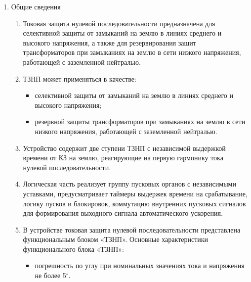 
\color{black}

\begin{enumerate}

\item Общие сведения

\begin{enumerate}

\item
Токовая защита нулевой последовательности предназначена для селективной защиты от замыканий на землю в линиях среднего и высокого напряжения, а также для резервирования защит трансформаторов при замыканиях на землю в сети низкого напряжения, работающей с заземленной нейтралью.

\item
ТЗНП может применяться в качестве:
\begin{itemize}
    \item селективной защиты от замыканий на землю в линиях среднего и высокого напряжения;
    \item резервной защиты трансформаторов при замыканиях на землю в сети низкого напряжения, работающей с заземленной нейтралью.
\end{itemize}

\item
Устройство содержит две ступени ТЗНП с независимой выдержкой времени от КЗ на землю, реагирующие на первую гармонику тока нулевой последовательности.

\item
Логическая часть реализует группу пусковых органов с независимыми уставками, предусматривает таймеры выдержек времени на срабатывание, логику пусков и блокировок, коммутацию внутренних пусковых сигналов для формирования выходного сигнала автоматического ускорения.

\item В устройстве токовая защита нулевой последовательности представлена функциональным блоком «ТЗНП». Основные характеристики функционального блока «ТЗНП»:
\begin{itemize}
    \item погрешность по углу при номинальных значениях тока и напряжения не более 5$^\circ$.
\end{itemize}


\end{enumerate}
\end{enumerate}
